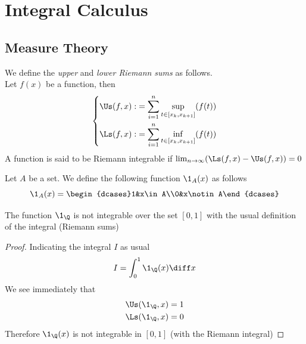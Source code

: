 \documentclass[../mmf.tex]{subfiles}
\begin{document}
\chapter{Integral Calculus}
\section{Measure Theory}
\begin{dfn}
	We define the \textit{upper} and \textit{lower Riemann sums} as follows.\\
	Let $f(x)$ be a function, then
	\begin{equation}
		\left\{\begin{aligned}
				\Us(f,x):&=\sum_{i=1}^n\sup_{t\in[x_k,x_{k+1}]}(f(t))\\
				\Ls(f,x):&=\sum_{i=1}^n\inf_{t\in[x_k,x_{k+1}]}(f(t))
		\end{aligned}\right.
		\label{eq:upperlowersums}
	\end{equation}
	A function is said to be Riemann integrable if $\lim_{n\to\infty}(\Ls(f,x)-\Us(f,x))=0$
\end{dfn}
\begin{dfn}
	Let $A$ be a set. We define the following function $\1_A(x)$ as follows
	\begin{equation}
		\1_A(x)=\begin{dcases}1&x\in A\\0&x\notin A\end{dcases}
		\label{eq:setfunc}
	\end{equation}
\end{dfn}
\begin{thm}
	The function $\1_{\Q}$ is not integrable over the set $[0,1]$ with the usual definition of the integral (Riemann sums)
\end{thm}
\begin{proof}
	Indicating the integral $I$ as usual
	\begin{equation*}
		I=\int_{0}^{1}\1_{\Q}(x)\diff x
	\end{equation*}
	We see immediately that
	\begin{equation*}
		\begin{aligned}
			\Us(\1_{\Q},x)&=1\\
			\Ls(\1_{\Q},x)&=0
		\end{aligned}
	\end{equation*}
	Therefore $\1_{\Q}(x)$ is not integrable in $[0,1]$ (with the Riemann integral)
\end{proof}
\end{document}

